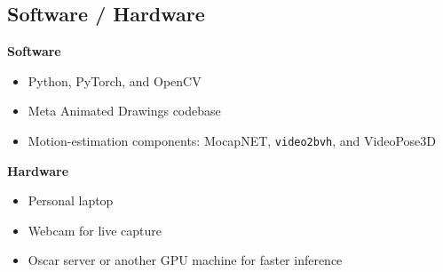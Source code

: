 




\subsection*{Software / Hardware}

\textbf{Software}
\begin{itemize}[itemsep=0pt, topsep=0pt]
  \item Python, PyTorch, and OpenCV
  \item Meta Animated Drawings codebase
  \item Motion-estimation components: MocapNET, \texttt{video2bvh}, and VideoPose3D
\end{itemize}


\textbf{Hardware}
\begin{itemize}[itemsep=0pt, topsep=0pt]
  \item Personal laptop
  \item Webcam for live capture
  \item Oscar server or another GPU machine for faster inference
\end{itemize}

